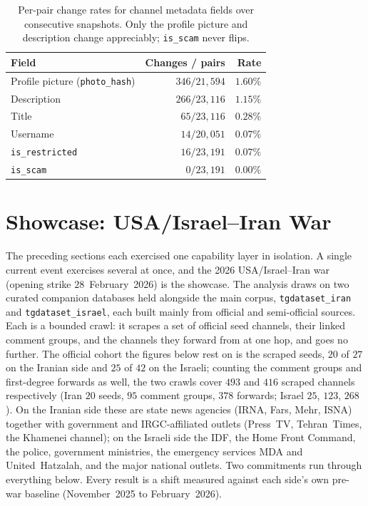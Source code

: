 \begin{table}[htbp]
\centering
\caption[Consecutive-snapshot metadata change rates.]{Per-pair change rates for channel metadata fields over consecutive snapshots. Only the profile picture and description change appreciably; \texttt{is\_scam} never flips.}
\label{tab:res-metadata}
\small
\setlength{\tabcolsep}{6pt}
\begin{tabular}{@{}lrr@{}}
\toprule
\textbf{Field} & \textbf{Changes / pairs} & \textbf{Rate} \\
\midrule
Profile picture (\texttt{photo\_hash}) & $346 / 21{,}594$ & $1.60\%$ \\
Description                            & $266 / 23{,}116$ & $1.15\%$ \\
Title                                  & $65 / 23{,}116$  & $0.28\%$ \\
Username                               & $14 / 20{,}051$  & $0.07\%$ \\
\texttt{is\_restricted}               & $16 / 23{,}191$  & $0.07\%$ \\
\texttt{is\_scam}                     & $0 / 23{,}191$   & $0.00\%$ \\
\bottomrule
\end{tabular}
\end{table}

\section{Showcase: USA/Israel--Iran War}
\label{sec:res-war}

The preceding sections each exercised one capability layer in isolation. A single current event exercises several at once, and the 2026 USA/Israel--Iran war (opening strike $28$~February~2026) is the showcase. The analysis draws on two curated companion databases held alongside the main corpus, \texttt{tgdataset\_iran} and \texttt{tgdataset\_israel}, each built mainly from official and semi-official sources. Each is a bounded crawl: it scrapes a set of official seed channels, their linked comment groups, and the channels they forward from at one hop, and goes no further. The official cohort the figures below rest on is the scraped seeds, $20$ of $27$ on the Iranian side and $25$ of $42$ on the Israeli; counting the comment groups and first-degree forwards as well, the two crawls cover $493$ and $416$ scraped channels respectively (Iran $20$ seeds, $95$ comment groups, $378$ forwards; Israel $25$, $123$, $268$). On the Iranian side these are state news agencies (IRNA, Fars, Mehr, ISNA) together with government and IRGC-affiliated outlets (Press~TV, Tehran~Times, the Khamenei channel); on the Israeli side the IDF, the Home Front Command, the police, government ministries, the emergency services MDA and United~Hatzalah, and the major national outlets. Two commitments run through everything below. Every result is a shift measured against each side's own pre-war baseline (November~2025 to February~2026).

